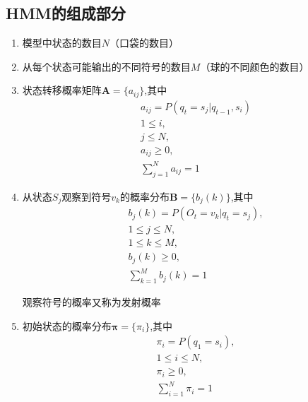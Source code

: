 \documentclass[a4paper,12pt]{book}
\begin{document}
    \subsection{HMM的组成部分}
    \begin{enumerate}
        \item 模型中状态的数目$N$（口袋的数目）
        \item 从每个状态可能输出的不同符号的数目$M$（球的不同颜色的数目）
        \item 状态转移概率矩阵$\boldsymbol{A} = \{a_{ij}\}$,其中
        \begin{equation}
            \begin{split}
                &a_{ij}=P(q_t=s_j|q_{t-1},s_i)\\
                &1 \le i, \\
                &j \le N,  \\
                &a_{ij} \ge 0, \\
                &\sum_{j=1}^N a_{ij} = 1
            \end{split}
        \end{equation}
        
        
        \item 从状态$S_j$观察到符号$v_k$的概率分布$\boldsymbol{B} = \{b_j(k)\}$,其中
        \begin{equation}
            \begin{split}
                &b_j(k) = P(O_t = v_k|q_t=s_j),\\
                &1 \le j \le N, \\
                &1\le k \le M,\\
                &b_j(k) \ge 0,\\
                &\sum_{k=1}^M b_j(k)  = 1
            \end{split}
        \end{equation}
        
        观察符号的概率又称为发射概率
        \item 初始状态的概率分布$\boldsymbol{\pi} = \{\pi_i\}$,其中
        \begin{equation}
            \begin{split}
                &\pi_i=P(q_1=s_i), \\
                &1 \le i \le N ,\\
                &\pi_i \ge 0, \\
                &\sum_{i=1}^N \pi_i= 1
            \end{split}
        \end{equation}
    \end{enumerate}
\end{document}
